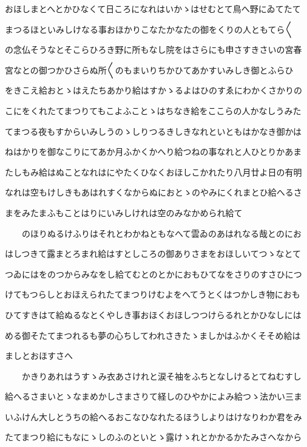 \documentclass[a4paper,11pt,landscape]{ltjtarticle}
\begin{document}
おほしまとへとかひなくて日ころになれはいかゝはせむとて鳥へ野にゐてたて
\par\medskip
まつるほといみしけなる事おほかりこなたかなたの御をくりの人ともてら〱
\par\medskip
の念仏そうなとそこらひろき野に所もなし院をはさらにも申さすきさいの宮春
\par\medskip
宮なとの御つかひさらぬ所〱のもまいりちかひてあかすいみしき御とふらひ
\par\medskip
をきこえ給おとゝはえたちあかり給はすかゝるよはひのすゑにわかくさかりの
\par\medskip
こにをくれたてまつりてもこよふことゝはちなき給をここらの人かなしうみた
\par\medskip
てまつる夜もすからいみしうのゝしりつるきしきなれといともはかなき御かは
\par\medskip
ねはかりを御なこりにてあか月ふかくかへり給つねの事なれと人ひとりかあま
\par\medskip
たしもみ給はぬことなれはにやたくひなくおほしこかれたり八月廿よ日の有明
\par\medskip
なれは空もけしきもあはれすくなからぬにおとゝのやみにくれまとひ給へるさ
\par\medskip
まをみたまふもことはりにいみしけれは空のみなかめられ給て
\par\medskip
　　のほりぬるけふりはそれとわかねともなへて雲ゐのあはれなる哉とのにお
\par\medskip
はしつきて露まとろまれ給はすとしころの御ありさまをおほしいてつゝなとて
\par\medskip
つゐにはをのつからみなをし給てむとのとかにおもひてなをさりのすさひにつ
\par\medskip
けてもつらしとおほえられたてまつりけむよをへてうとくはつかしき物におも
\par\medskip
ひてすきはて給ぬるなとくやしき事おほくおほしつつけらるれとかひなしには
\par\medskip
める御そたてまつれるも夢の心ちしてわれさきたゝましかはふかくそそめ給は
\par\medskip
ましとおほすさへ
\par\medskip
　　かきりあれはうすゝみ衣あさけれと涙そ袖をふちとなしけるとてねむすし
\par\medskip
給へるさまいとゝなまめかしさまさりて経しのひやかによみ給つゝ法かい三ま
\par\medskip
いふけん大しとうちの給へるおこなひなれたるほうしよりはけなりわか君をみ
\par\medskip
たてまつり給にもなにゝしのふのといとゝ露けゝれとかかるかたみさへなから
\end{document}
